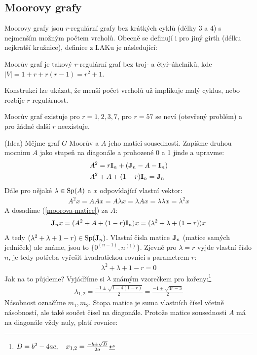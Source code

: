 \subsection{Moorovy grafy}

Moorovy grafy jsou $r$-regulární grafy bez krátkých cyklů (délky 3 a 4) s nejmenším možným počtem vrcholů. Obecně se definují i pro jiný girth (délku nejkratší kružnice), definice z LAKu je následující:

\df Moorův graf je takový $r$-regulární graf bez troj- a čtyř-úhelníků, kde $|V| = 1 + r + r(r-1) = r^2 + 1$.

Konstrukcí lze ukázat, že menší počet vrcholů už implikuje malý cyklus, nebo rozbije $r$-regulárnost.

\vt Moorův graf existuje pro $r=1,2,3,7$, pro $r=57$ se neví (otevřený problém) a pro žádné další $r$ neexistuje.

\dk (Idea) Mějme graf $G$ Moorův a $A$ jeho matici sousednosti. Zapišme druhou
mocninu $A$ jako stupeň na diagonále a prohozené 0 a 1 jinde a upravme:
\begin{align}
	&A^2 = r{\bf I}_n + ({\bf J}_n- A - {\bf I}_n) \\
	\label{moorova-matice}&A^2 + A + (1-r){\bf I}_n = {\bf J}_n
\end{align}
Dále pro nějaké $\lambda\in \operatorname{Sp}(A)$ a $x$ odpovídající vlastní vektor:
\begin{align}
	\label{moorova-mocnina}A^2 x = AAx = A\lambda x = \lambda A x = \lambda
	\lambda x = \lambda^2 x
\end{align}
A dosadíme (\ref{moorova-matice}) za $A$:
\begin{align}
	{\bf J}_nx = (A^2 + A + (1-r){\bf I}_n)x = (\lambda^2 + \lambda + (1-r))x
\end{align}
A tedy $(\lambda^2 + \lambda + 1 -r) \in \operatorname{Sp}({\bf J}_n)$. Vlastní čísla matice ${\bf J}_n$
(matice samých jedniček) ale známe, jsou to $\{0^{(n-1)}, n^{(1)}\}$. Zjevně pro
$\lambda = r$ vyjde vlastní číslo $n$, je tedy potřeba vyřešit kvadratickou
rovnici s parametrem $r$:
\begin{align}
	\lambda^2 + \lambda + 1 - r = 0
\end{align}
Jak na to půjdeme? Vyjádříme si $\lambda$ známým vzorečkem pro kořeny:\footnote{$D=b^2-4ac,\quad x_{1,2} = {-b \pm \sqrt D \over 2a}$}
\begin{align}
	\lambda_{1,2} = \frac{-1\pm \sqrt{1-4(1-r)}}{2} = \frac{-1\pm\sqrt{4r-3}}{2}
\end{align}
Násobnost označíme $m_1, m_2$. Stopa matice je suma vlastních čísel včetně
násobností, ale také součet čísel na diagonále. Protože matice sousednosti $A$
má na diagonále vždy nuly, platí rovnice:


